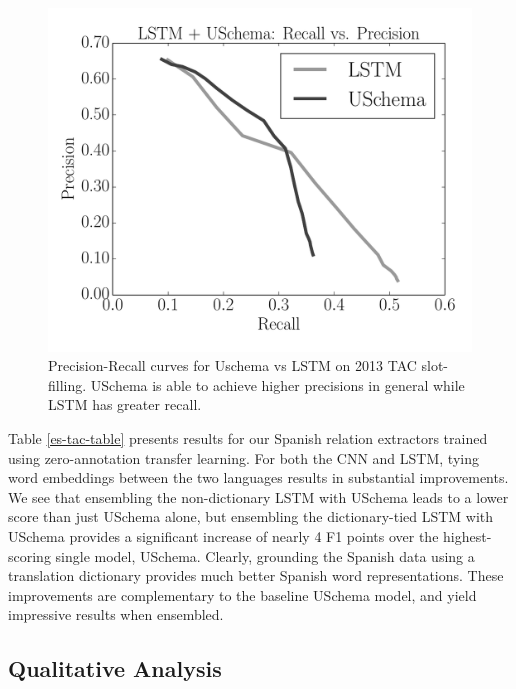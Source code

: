 \begin{figure}
\begin{center}
\includegraphics[scale=0.45]{pr-curve}
\caption{Precision-Recall curves for Uschema vs LSTM on 2013 TAC slot-filling. USchema is able to achieve higher precisions in general while LSTM has greater recall. \label{fig:pr-curve}}
\end{center}
\end{figure}

Table \ref{es-tac-table} presents results for our Spanish relation extractors trained using zero-annotation transfer learning. For both the CNN and LSTM, tying word embeddings between the two languages results in substantial improvements. We see that ensembling the non-dictionary LSTM with USchema leads to a lower score than just USchema alone, but ensembling the dictionary-tied LSTM with USchema provides a significant increase of nearly 4 F1 points over the highest-scoring single model, USchema. Clearly, grounding the Spanish data using a translation dictionary provides much better Spanish word representations. These improvements are complementary to the baseline USchema model, and yield impressive results when ensembled. 


\subsection{Qualitative Analysis \label{sec:qual-anal}}

